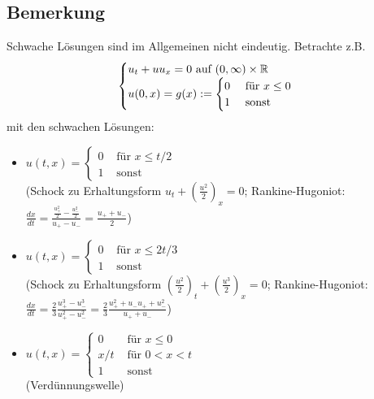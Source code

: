 \subsection{Bemerkung}
\label{bem_19}
	Schwache Lösungen sind im Allgemeinen nicht eindeutig. Betrachte z.B. \marginnote{[19]}
	\[ \begin{cases} 
		u_t + uu_x = 0 \text{ auf } (0,\infty) \times \mathbb{R} \\
		u(0,x) = g(x) := \begin{cases}
			0 & \text{ für } x \leq 0 \\
			1 & \text{ sonst} \end{cases} \end{cases} \]
	mit den schwachen Lösungen:
	\begin{itemize}
		\item $u(t,x) = \begin{cases}
			0 & \text{ für } x \leq t/2 \\
			1 & \text{ sonst} \end{cases}$ \\
		(Schock zu Erhaltungsform $u_t + \left( \frac{u^2}{2} \right)_x = 0$; Rankine-Hugoniot: $\frac{dx}{dt} = \frac{\frac{u_+^2}{2}-\frac{u_-^2}{2}}{u_+-u_-} = \frac{u_++u_-}{2}$)
		\item $u(t,x) = \begin{cases}
			0 & \text{ für } x \leq 2t/3 \\
			1 & \text{ sonst} \end{cases}$ \\
		(Schock zu Erhaltungsform $\left( \frac{u^2}{2} \right)_t + \left( \frac{u^3}{2} \right)_x = 0$; Rankine-Hugoniot: $\frac{dx}{dt} = \frac{2}{3} \frac{u_+^3-u_-^3}{u_+^2-u_-^2} = \frac{2}{3} \frac{u_+^2+u_-u_++u_-^2}{u_++u_-}$)
		\item $u(t,x) = \begin{cases}
			0 & \text{ für } x\leq 0 \\
			x/t & \text{ für } 0 < x < t \\
			1 & \text{ sonst} \end{cases}$ \\
		(Verdünnungswelle)
	\end{itemize}
